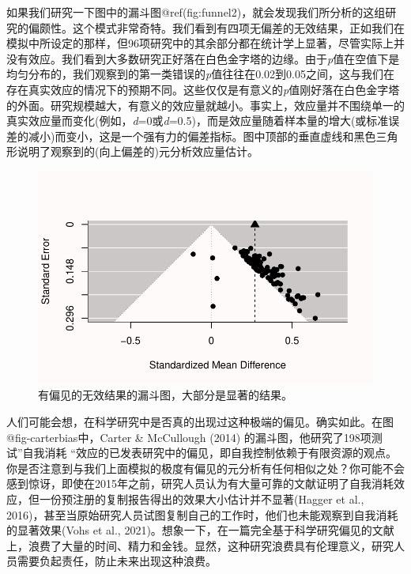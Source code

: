 \documentclass[
  letterpaper,
  DIV=11,
  numbers=noendperiod]{scrreprt}
\begin{document}
如果我们研究一下图中的漏斗图@ref(fig:funnel2)，就会发现我们所分析的这组研究的偏颇性。这个模式非常奇特。我们看到有四项无偏差的无效结果，正如我们在模拟中所设定的那样，但96项研究中的其余部分都在统计学上显著，尽管实际上并没有效应。我们看到大多数研究正好落在白色金字塔的边缘。由于\emph{p}值在空值下是均匀分布的，我们观察到的第一类错误的\emph{p}值往往在0.02到0.05之间，这与我们在存在真实效应的情况下的预期不同。这些仅仅是有意义的\emph{p}值刚好落在白色金字塔的外面。研究规模越大，有意义的效应量就越小。事实上，效应量并不围绕单一的真实效应量而变化(例如，\emph{d}=0或\emph{d}=0.5)，而是效应量随着样本量的增大(或标准误差的减小)而变小，这是一个强有力的偏差指标。图中顶部的垂直虚线和黑色三角形说明了观察到的(向上偏差的)元分析效应量估计。

\begin{figure}

{\centering \includegraphics[width=1\textwidth,height=\textheight]{12-bias_files/figure-pdf/fig-funnel2-1.pdf}

}

\caption{\label{fig-funnel2}有偏见的无效结果的漏斗图，大部分是显著的结果。}

\end{figure}

人们可能会想，在科学研究中是否真的出现过这种极端的偏见。确实如此。在图@fig-carterbias中，Carter
\& McCullough (2014) 的漏斗图，他研究了198项测试''自我消耗
``效应的已发表研究中的偏见，即自我控制依赖于有限资源的观点。你是否注意到与我们上面模拟的极度有偏见的元分析有任何相似之处？你可能不会感到惊讶，即使在2015年之前，研究人员认为有大量可靠的文献证明了自我消耗效应，但一份预注册的复制报告得出的效果大小估计并不显著(Hagger
et al.,
2016)，甚至当原始研究人员试图复制自己的工作时，他们也未能观察到自我消耗的显著效果(Vohs
et al.,
2021)。想象一下，在一篇完全基于科学研究偏见的文献上，浪费了大量的时间、精力和金钱。显然，这种研究浪费具有伦理意义，研究人员需要负起责任，防止未来出现这种浪费。
\end{document}
